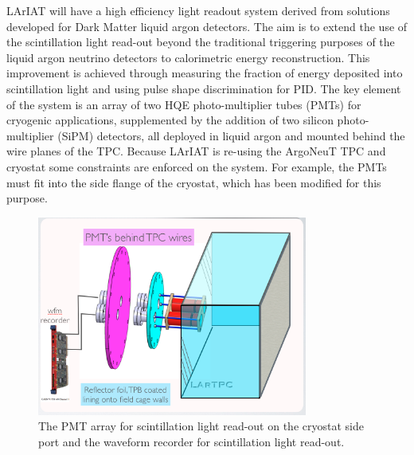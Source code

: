 \documentclass[DIV=calc, paper=a4, fontsize=10pt, twocolumn]{scrartcl}	 %
\begin{document}
{LArIAT will have a high efficiency light readout system derived from solutions developed for Dark Matter liquid argon detectors. The aim is to extend the use of the scintillation light read-out  beyond the traditional triggering purposes of the liquid argon neutrino detectors to calorimetric energy reconstruction.  This improvement is achieved through measuring the fraction of energy deposited into scintillation light and using pulse shape discrimination for PID. The key element of the system is an array of two HQE photo-multiplier tubes (PMTs) for cryogenic applications, supplemented by the addition of two silicon photo-multiplier (SiPM) detectors, all deployed in liquid argon and mounted behind the wire planes of the TPC. Because LArIAT is re-using the ArgoNeuT TPC and cryostat some constraints are enforced on the system.  For example, the PMTs must fit into the side flange of the cryostat, which has been modified for this purpose.
\begin{figure}[h]
\begin{centering}
\includegraphics[width=3.5in]{Figures/ScintLightSyst}
\caption{ {\scriptsize \sf The PMT array for scintillation light read-out on the cryostat side port and the waveform recorder for scintillation light read-out.}  }
\label{PMT_mod}
\end{centering}
\end{figure}

}
\end{document}

